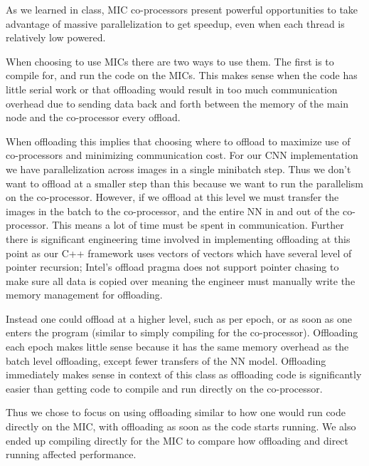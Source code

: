 As we learned in class, MIC co-processors present powerful opportunities to take advantage of massive parallelization to get speedup, even when each thread is relatively low powered.

When choosing to use MICs there are two ways to use them. The first is to compile for, and run the code on the MICs. This makes sense when the code has little serial work or that offloading would result in too much communication overhead due to sending data back and forth between the memory of the main node and the co-processor every offload.

When offloading this implies that choosing where to offload to maximize use of co-processors and minimizing communication cost. For our CNN implementation we have parallelization across images in a single minibatch step. Thus we don't want to offload at a smaller step than this because we want to run the parallelism on the co-processor. However, if we offload at this level we must transfer the images in the batch to the co-processor, and the entire NN in and out of the co-processor. This means a lot of time must be spent in communication. Further there is significant engineering time involved in implementing offloading at this point as our C++ framework uses vectors of vectors which have several level of pointer recursion; Intel's offload pragma does not support pointer chasing to make sure all data is copied over meaning the engineer must manually write the memory management for offloading.

Instead one could offload at a higher level, such as per epoch, or as soon as one enters the program (similar to simply compiling for the co-processor). Offloading each epoch makes little sense because it has the same memory overhead as the batch level offloading, except fewer transfers of the NN model. Offloading immediately makes sense in context of this class as offloading code is significantly easier than getting code to compile and run directly on the co-processor.

Thus we chose to focus on using offloading similar to how one would run code directly on the MIC, with offloading as soon as the code starts running. We also ended up compiling directly for the MIC to compare how offloading and direct running affected performance.
%
